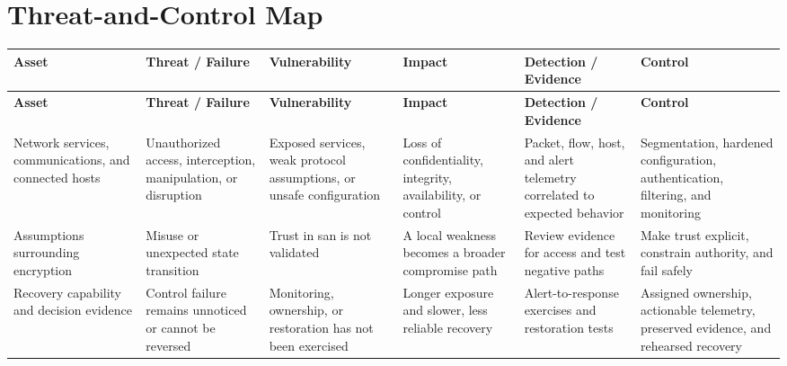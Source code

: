 \documentclass[11pt]{article}
\begin{document}
\section*{Threat-and-Control Map}
\begingroup\scriptsize\setlength{\tabcolsep}{2pt}
\begin{longtable}{>{\RaggedRight\arraybackslash}p{}>{\RaggedRight\arraybackslash}p{}>{\RaggedRight\arraybackslash}p{}>{\RaggedRight\arraybackslash}p{}>{\RaggedRight\arraybackslash}p{}>{\RaggedRight\arraybackslash}p{}}
\toprule\rowcolor{Navy}\color{white}\textbf{Asset} & \color{white}\textbf{Threat / Failure} & \color{white}\textbf{Vulnerability} & \color{white}\textbf{Impact} & \color{white}\textbf{Detection / Evidence} & \color{white}\textbf{Control}\\\midrule
\endfirsthead
\toprule\rowcolor{Navy}\color{white}\textbf{Asset} & \color{white}\textbf{Threat / Failure} & \color{white}\textbf{Vulnerability} & \color{white}\textbf{Impact} & \color{white}\textbf{Detection / Evidence} & \color{white}\textbf{Control}\\\midrule
\endhead
Network services, communications, and connected hosts & Unauthorized access, interception, manipulation, or disruption & Exposed services, weak protocol assumptions, or unsafe configuration & Loss of confidentiality, integrity, availability, or control & Packet, flow, host, and alert telemetry correlated to expected behavior & Segmentation, hardened configuration, authentication, filtering, and monitoring\\\midrule
Assumptions surrounding encryption & Misuse or unexpected state transition & Trust in san is not validated & A local weakness becomes a broader compromise path & Review evidence for access and test negative paths & Make trust explicit, constrain authority, and fail safely\\\midrule
Recovery capability and decision evidence & Control failure remains unnoticed or cannot be reversed & Monitoring, ownership, or restoration has not been exercised & Longer exposure and slower, less reliable recovery & Alert-to-response exercises and restoration tests & Assigned ownership, actionable telemetry, preserved evidence, and rehearsed recovery\\\midrule
\bottomrule
\end{longtable}
\endgroup
\end{document}
